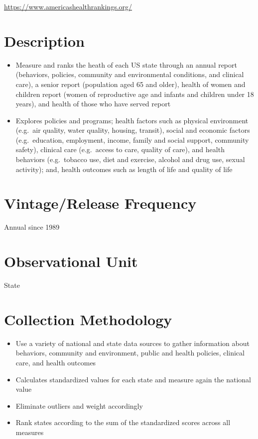 \documentclass[
]{book}
\providecommand{\tightlist}{%
  \setlength{\itemsep}{0pt}\setlength{\parskip}{0pt}}
\begin{document}
\url{https://www.americashealthrankings.org/}

\hypertarget{description-1}{%
\section{Description}\label{description-1}}

\begin{itemize}
\tightlist
\item
  Measure and ranks the heath of each US state through an annual report (behaviors, policies, community and environmental conditions, and clinical care), a senior report (population aged 65 and older), health of women and children report (women of reproductive age and infants and children under 18 years), and health of those who have served report
\item
  Explores policies and programs; health factors such as physical environment (e.g.~air quality, water quality, housing, transit), social and economic factors (e.g.~education, employment, income, family and social support, community safety), clinical care (e.g.~access to care, quality of care), and health behaviors (e.g.~tobacco use, diet and exercise, alcohol and drug use, sexual activity); and, health outcomes such as length of life and quality of life
\end{itemize}

\hypertarget{vintagerelease-frequency-1}{%
\section{Vintage/Release Frequency}\label{vintagerelease-frequency-1}}

Annual since 1989

\hypertarget{observational-unit-1}{%
\section{Observational Unit}\label{observational-unit-1}}

State

\hypertarget{collection-methodology-1}{%
\section{Collection Methodology}\label{collection-methodology-1}}

\begin{itemize}
\tightlist
\item
  Use a variety of national and state data sources to gather information about behaviors, community and environment, public and health policies, clinical care, and health outcomes
\item
  Calculates standardized values for each state and measure again the national value
\item
  Eliminate outliers and weight accordingly
\item
  Rank states according to the sum of the standardized scores across all measures
\end{itemize}
\end{document}
